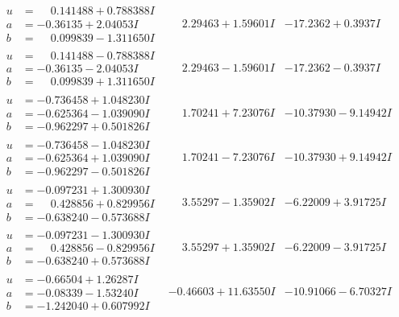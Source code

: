 \documentclass[1p]{elsarticle_modified}
\theoremstyle{definition}
\begin{document}
$$\begin{array}{c|c|c}
\begin{aligned}
u &= \phantom{-}0.141488 + 0.788388 I \\
a &= -0.36135 + 2.04053 I \\
b &= \phantom{-}0.099839 - 1.311650 I\end{aligned}
 & \phantom{-}2.29463 + 1.59601 I & -17.2362 + 0.3937 I \\ \hline\begin{aligned}
u &= \phantom{-}0.141488 - 0.788388 I \\
a &= -0.36135 - 2.04053 I \\
b &= \phantom{-}0.099839 + 1.311650 I\end{aligned}
 & \phantom{-}2.29463 - 1.59601 I & -17.2362 - 0.3937 I \\ \hline\begin{aligned}
u &= -0.736458 + 1.048230 I \\
a &= -0.625364 - 1.039090 I \\
b &= -0.962297 + 0.501826 I\end{aligned}
 & \phantom{-}1.70241 + 7.23076 I & -10.37930 - 9.14942 I \\ \hline\begin{aligned}
u &= -0.736458 - 1.048230 I \\
a &= -0.625364 + 1.039090 I \\
b &= -0.962297 - 0.501826 I\end{aligned}
 & \phantom{-}1.70241 - 7.23076 I & -10.37930 + 9.14942 I \\ \hline\begin{aligned}
u &= -0.097231 + 1.300930 I \\
a &= \phantom{-}0.428856 + 0.829956 I \\
b &= -0.638240 - 0.573688 I\end{aligned}
 & \phantom{-}3.55297 - 1.35902 I & -6.22009 + 3.91725 I \\ \hline\begin{aligned}
u &= -0.097231 - 1.300930 I \\
a &= \phantom{-}0.428856 - 0.829956 I \\
b &= -0.638240 + 0.573688 I\end{aligned}
 & \phantom{-}3.55297 + 1.35902 I & -6.22009 - 3.91725 I \\ \hline\begin{aligned}
u &= -0.66504 + 1.26287 I \\
a &= -0.08339 - 1.53240 I \\
b &= -1.242040 + 0.607992 I\end{aligned}
 & -0.46603 + 11.63550 I & -10.91066 - 6.70327 I \\ \hline\begin{aligned}

\end{aligned}
\end{array}$$
\end{document}
